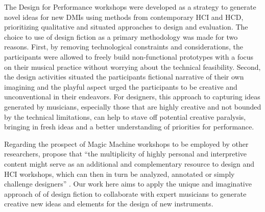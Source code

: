 \documentclass[letterpaper, 12pt]{article}
\begin{document}
The Design for Performance workshops were developed as a strategy to generate novel ideas for new DMIs using methods from contemporary HCI and HCD, prioritizing qualitative and situated approaches to design and evaluation. 
The choice to use of design fiction as a primary methodology was made for two reasons. First, by removing technological constraints and considerations, the participants were allowed to freely build non-functional prototypes with a focus on their musical practice without worrying about the technical feasibility.
Second, the design activities situated the participants fictional narrative of their own imagining and the playful aspect urged the participants to be creative and unconventional in their endeavors. For designers, this approach to capturing ideas generated by musicians, especially those that are highly creative and not bounded by the technical limitations, can help to stave off potential creative paralysis, bringing in fresh ideas and a better understanding of priorities for performance.

Regarding the prospect of Magic Machine workshops to be employed by other researchers, \citeauthor{Andersen2019} propose that ``the multiplicity of highly personal and interpretive content might serve as an additional and complementary resource to design and HCI workshops, which can then in turn be analyzed, annotated or simply challenge designers'' \citeyear[p. 12]{Andersen2019}. Our work here aims to apply the unique and imaginative approach of of design fiction to collaborate with expert musicians to generate creative new ideas and elements for the design of new instruments. 

\end{document}
